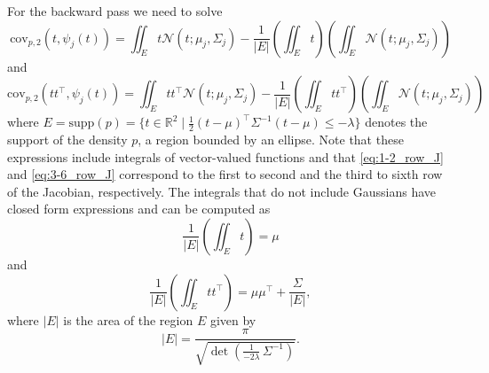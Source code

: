\documentclass{article}
\begin{document}
For the backward pass we need to solve
\begin{equation}
\label{eq:1-2_row_J}
\mathrm{cov}_{p, 2}(t, \psi_j(t)) =
\iint_{E} t\mathcal{N}(t; \mu_j, \Sigma_j)
- \frac{1}{|E|}\left(\iint_{E} t\right)\left(\iint_{E} \mathcal{N}(t; \mu_j, \Sigma_j)\right)
\end{equation}and 
\begin{equation}
\label{eq:3-6_row_J}
\mathrm{cov}_{p, 2}(tt^\top, \psi_j(t)) =
\iint_{E} tt^\top\mathcal{N}(t; \mu_j, \Sigma_j)
- \frac{1}{|E|}\left(\iint_{E} tt^\top\right)\left(\iint_{E} \mathcal{N}(t; \mu_j, \Sigma_j)\right)
\end{equation} where $E = \mathrm{supp}(p) = \{t \in \mathbb{R}^2 \mid \frac{1}{2}(t-\mu)^\top \Sigma^{-1} (t-\mu) \le -\lambda\}$ denotes the support of the density $p$, a region bounded by an ellipse. 
Note that these expressions include integrals of vector-valued functions and that \eqref{eq:1-2_row_J} and \eqref{eq:3-6_row_J} correspond to the first to second and the third to sixth row of the Jacobian, respectively. The integrals that do not include Gaussians have closed form expressions and can be computed as
\begin{equation}
    \frac{1}{|E|}\left(\iint_{E} t\right)=\mu
\end{equation}
and
\begin{equation}
    \frac{1}{|E|}\left(\iint_{E} tt^\top\right)=\mu\mu^\top+\frac{\Sigma}{|E|},
\end{equation} where $|E|$ is the area of the region $E$ given by
\begin{equation}
    |E|=\frac{\pi}{\sqrt{ \det \left( \frac{1}{-2\lambda}\,\Sigma^{-1}\right)}}.
\end{equation}
\end{document}
